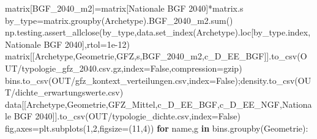 \documentclass[
  ngerman,
  a4paper,
  DIV=11]{scrreprt}
\newenvironment{Shaded}{\begin{snugshade}}{\end{snugshade}}
\newcommand{\BuiltInTok}[1]{\textcolor[rgb]{0.00,0.23,0.31}{#1}}
\newcommand{\ControlFlowTok}[1]{\textcolor[rgb]{0.00,0.23,0.31}{\textbf{#1}}}
\newcommand{\DecValTok}[1]{\textcolor[rgb]{0.68,0.00,0.00}{#1}}
\newcommand{\FloatTok}[1]{\textcolor[rgb]{0.68,0.00,0.00}{#1}}
\newcommand{\KeywordTok}[1]{\textcolor[rgb]{0.00,0.23,0.31}{\textbf{#1}}}
\newcommand{\NormalTok}[1]{\textcolor[rgb]{0.00,0.23,0.31}{#1}}
\newcommand{\OperatorTok}[1]{\textcolor[rgb]{0.37,0.37,0.37}{#1}}
\newcommand{\StringTok}[1]{\textcolor[rgb]{0.13,0.47,0.30}{#1}}
\newcommand{\VariableTok}[1]{\textcolor[rgb]{0.07,0.07,0.07}{#1}}
\begin{document}
\begin{Shaded}
\begin{Highlighting}[]
\NormalTok{matrix[}\StringTok{\textquotesingle{}BGF\_2040\_m2\textquotesingle{}}\NormalTok{]}\OperatorTok{=}\NormalTok{matrix[}\StringTok{\textquotesingle{}Nationale BGF 2040\textquotesingle{}}\NormalTok{]}\OperatorTok{*}\NormalTok{matrix.s}
\NormalTok{by\_type}\OperatorTok{=}\NormalTok{matrix.groupby(}\StringTok{\textquotesingle{}Archetype\textquotesingle{}}\NormalTok{).BGF\_2040\_m2.}\BuiltInTok{sum}\NormalTok{()}
\NormalTok{np.testing.assert\_allclose(by\_type,data.set\_index(}\StringTok{\textquotesingle{}Archetype\textquotesingle{}}\NormalTok{).loc[by\_type.index,}\StringTok{\textquotesingle{}Nationale BGF 2040\textquotesingle{}}\NormalTok{],rtol}\OperatorTok{=}\FloatTok{1e{-}12}\NormalTok{)}
\NormalTok{matrix[[}\StringTok{\textquotesingle{}Archetype\textquotesingle{}}\NormalTok{,}\StringTok{\textquotesingle{}Geometrie\textquotesingle{}}\NormalTok{,}\StringTok{\textquotesingle{}GFZ\textquotesingle{}}\NormalTok{,}\StringTok{\textquotesingle{}s\textquotesingle{}}\NormalTok{,}\StringTok{\textquotesingle{}BGF\_2040\_m2\textquotesingle{}}\NormalTok{,}\StringTok{\textquotesingle{}c\_D\_EE\_BGF\textquotesingle{}}\NormalTok{]].to\_csv(OUT}\OperatorTok{/}\StringTok{\textquotesingle{}typologie\_gfz\_2040.csv.gz\textquotesingle{}}\NormalTok{,index}\OperatorTok{=}\VariableTok{False}\NormalTok{,compression}\OperatorTok{=}\StringTok{\textquotesingle{}gzip\textquotesingle{}}\NormalTok{)}
\NormalTok{bins.to\_csv(OUT}\OperatorTok{/}\StringTok{\textquotesingle{}gfz\_kontext\_verteilungen.csv\textquotesingle{}}\NormalTok{,index}\OperatorTok{=}\VariableTok{False}\NormalTok{)}\OperatorTok{;}\NormalTok{density.to\_csv(OUT}\OperatorTok{/}\StringTok{\textquotesingle{}dichte\_erwartungswerte.csv\textquotesingle{}}\NormalTok{)}
\NormalTok{data[[}\StringTok{\textquotesingle{}Archetype\textquotesingle{}}\NormalTok{,}\StringTok{\textquotesingle{}Geometrie\textquotesingle{}}\NormalTok{,}\StringTok{\textquotesingle{}GFZ\_Mittel\textquotesingle{}}\NormalTok{,}\StringTok{\textquotesingle{}c\_D\_EE\_BGF\textquotesingle{}}\NormalTok{,}\StringTok{\textquotesingle{}c\_D\_EE\_NGF\textquotesingle{}}\NormalTok{,}\StringTok{\textquotesingle{}Nationale BGF 2040\textquotesingle{}}\NormalTok{]].to\_csv(OUT}\OperatorTok{/}\StringTok{\textquotesingle{}typologie\_dichte.csv\textquotesingle{}}\NormalTok{,index}\OperatorTok{=}\VariableTok{False}\NormalTok{)}
\NormalTok{fig,axes}\OperatorTok{=}\NormalTok{plt.subplots(}\DecValTok{1}\NormalTok{,}\DecValTok{2}\NormalTok{,figsize}\OperatorTok{=}\NormalTok{(}\DecValTok{11}\NormalTok{,}\DecValTok{4}\NormalTok{))}
\ControlFlowTok{for}\NormalTok{ name,g }\KeywordTok{in}\NormalTok{ bins.groupby(}\StringTok{\textquotesingle{}Geometrie\textquotesingle{}}\NormalTok{):}

\end{Highlighting}
\end{Shaded}
\end{document}
